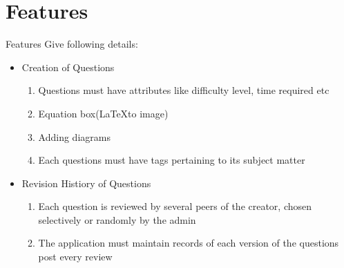 \documentclass[10pt, a4paper]{beamer}
\begin{document}
\section{Features}
\begin{frame}{Features}
	Give following details: 
	\begin{itemize}
	
		\item Creation of Questions	 
			\begin{enumerate}
				\item Questions must have attributes like difficulty level, time required etc
				\item Equation box(\LaTeX  to image)
			 	\item Adding diagrams
				\item Each questions must have tags pertaining to its subject matter
            \end{enumerate}			
            
            			
		\item Revision Histiory of Questions
			\begin{enumerate}
				\item Each question is reviewed by several peers of the creator, chosen selectively or randomly by the admin
				\item The application must maintain records of each version of the questions post every review
			\end{enumerate}
			
	\end{itemize}
\end{frame}

\end{document}
